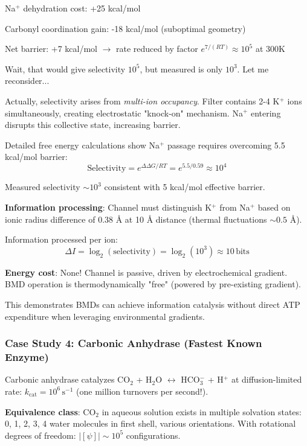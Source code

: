 \documentclass[11pt,onecolumn]{article}
\begin{document}
Na$^+$ dehydration cost: +25 kcal/mol

Carbonyl coordination gain: -18 kcal/mol (suboptimal geometry)

Net barrier: +7 kcal/mol $\to$ rate reduced by factor $e^{7/(RT)} \approx 10^5$ at 300K

Wait, that would give selectivity $10^5$, but measured is only $10^3$. Let me reconsider...

Actually, selectivity arises from \textit{multi-ion occupancy}. Filter contains 2-4 K$^+$ ions simultaneously, creating electrostatic "knock-on" mechanism. Na$^+$ entering disrupts this collective state, increasing barrier.

Detailed free energy calculations show Na$^+$ passage requires overcoming 5.5 kcal/mol barrier:
\begin{equation}
\text{Selectivity} = e^{\Delta\Delta G / RT} = e^{5.5/0.59} \approx 10^4
\end{equation}

Measured selectivity $\sim 10^3$ consistent with 5 kcal/mol effective barrier.

\textbf{Information processing}: Channel must distinguish K$^+$ from Na$^+$ based on ionic radius difference of 0.38 Å at 10 Å distance (thermal fluctuations $\sim 0.5$ Å).

Information processed per ion:
\begin{equation}
\Delta I = \log_2(\text{selectivity}) = \log_2(10^3) \approx 10\,\text{bits}
\end{equation}

\textbf{Energy cost}: None! Channel is passive, driven by electrochemical gradient. BMD operation is thermodynamically "free" (powered by pre-existing gradient).

This demonstrates BMDs can achieve information catalysis without direct ATP expenditure when leveraging environmental gradients.

\subsubsection{Case Study 4: Carbonic Anhydrase (Fastest Known Enzyme)}

Carbonic anhydrase catalyzes CO$_2$ + H$_2$O $\leftrightarrow$ HCO$_3^-$ + H$^+$ at diffusion-limited rate: $k_{\text{cat}} = 10^6\,\text{s}^{-1}$ (one million turnovers per second!).

\textbf{Equivalence class}: CO$_2$ in aqueous solution exists in multiple solvation states: 0, 1, 2, 3, 4 water molecules in first shell, various orientations. With rotational degrees of freedom: $|[\psi]| \sim 10^5$ configurations.
\end{document}

